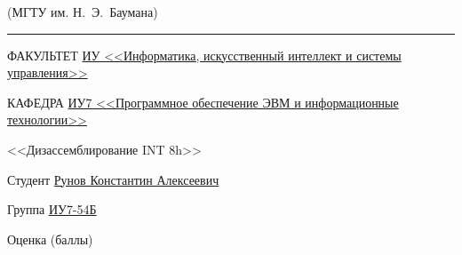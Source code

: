 \begin{titlepage}
\begin{center}
{\begin{minipage}{0.80\textwidth}
{                    {(МГТУ им. Н.~Э.~Баумана)}
                }
            \end{minipage}
        }

        \vspace{0.2cm}
        \rule{\linewidth}{3.4pt}

        \begin{flushleft}
            {ФАКУЛЬТЕТ \uline{ИУ <<Информатика, искусственный интеллект и системы управления>> \hfill}}

            \vspace{0.5cm}

            {КАФЕДРА \uline{ИУ7 <<Программное обеспечение ЭВМ и информационные технологии>> \hfill}}
        \end{flushleft}

        \vfill

        {
            \Large{\textbf{}}

            \Large{\textbf{}}

            \large{<<Дизассемблирование INT 8h>>}

            \vspace{0.5cm}
        }

        \vspace{0.5cm}


        \fontsize{14pt}{14pt}\selectfont


        \begin{flushleft}
            {Студент \uline{Рунов Константин Алексеевич \hfill}}

            \vspace{0.5cm}

            {Группа \uline{ИУ7-54Б \hfill}}

            \vspace{0.5cm}

            {Оценка (баллы) \uline{\hfill}}


\end{flushleft}
\end{center}
\end{titlepage}
